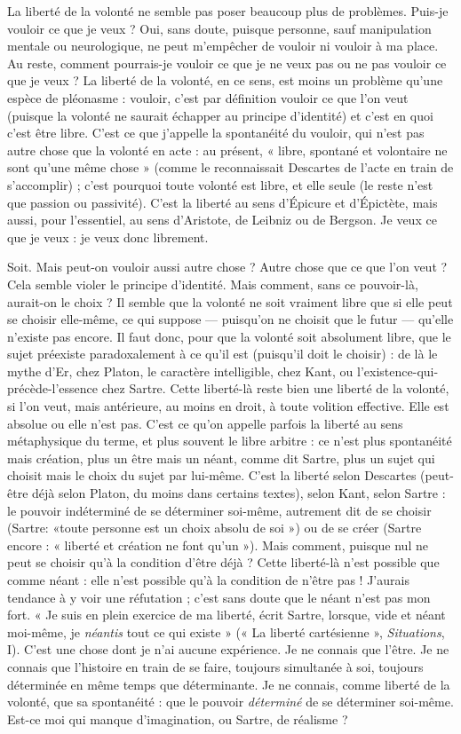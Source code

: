 {La liberté de la volonté ne semble pas poser beaucoup plus de problèmes.
Puis-je vouloir ce que je veux ? Oui, sans doute, puisque personne, sauf manipulation
mentale ou neurologique, ne peut m'empêcher de vouloir ni vouloir à
ma place. Au reste, comment pourrais-je vouloir ce que je ne veux pas ou ne
pas vouloir ce que je veux ? La liberté de la volonté, en ce sens, est moins un
problème qu’une espèce de pléonasme : vouloir, c’est par définition vouloir ce
que l’on veut (puisque la volonté ne saurait échapper au principe d’identité) et
c’est en quoi c’est être libre. C’est ce que j'appelle la spontanéité du vouloir, qui
n’est pas autre chose que la volonté en acte : au présent, « libre, spontané et
volontaire ne sont qu’une même chose » (comme le reconnaissait Descartes de
l'acte en train de s'accomplir) ; c'est pourquoi toute volonté est libre, et elle
seule (le reste n’est que passion ou passivité). C’est la liberté au sens d’Épicure
et d’Épictète, mais aussi, pour l'essentiel, au sens d’Aristote, de Leibniz ou de
Bergson. Je veux ce que je veux : je veux donc librement.

Soit. Mais peut-on vouloir aussi autre chose ? Autre chose que ce que l’on
veut ? Cela semble violer le principe d’identité. Mais comment, sans ce pouvoir-là,
aurait-on le choix ? Il semble que la volonté ne soit vraiment libre que
si elle peut se choisir elle-même, ce qui suppose — puisqu'on ne choisit que le
futur — qu’elle n’existe pas encore. Il faut donc, pour que la volonté soit absolument
libre, que le sujet préexiste paradoxalement à ce qu’il est (puisqu'il doit
le choisir) : de là le mythe d’Er, chez Platon, le caractère intelligible, chez Kant,
ou l’existence-qui-précède-l’essence chez Sartre. Cette liberté-là reste bien une
liberté de la volonté, si l’on veut, mais antérieure, au moins en droit, à toute
volition effective. Elle est absolue ou elle n’est pas. C’est ce qu’on appelle parfois
la liberté au sens métaphysique du terme, et plus souvent le libre arbitre :
ce n’est plus spontanéité mais création, plus un être mais un néant, comme dit
Sartre, plus un sujet qui choisit mais le choix du sujet par lui-même. C’est la
liberté selon Descartes (peut-être déjà selon Platon, du moins dans certains
textes), selon Kant, selon Sartre : le pouvoir indéterminé de se déterminer soi-même,
autrement dit de se choisir (Sartre: «toute personne est un choix
absolu de soi ») ou de se créer (Sartre encore : « liberté et création ne font
qu’un »). Mais comment, puisque nul ne peut se choisir qu’à la condition
d’être déjà ? Cette liberté-là n’est possible que comme néant : elle n’est possible
qu’à la condition de n’être pas ! J'aurais tendance à y voir une réfutation ; c’est
sans doute que le néant n’est pas mon fort. « Je suis en plein exercice de ma
liberté, écrit Sartre, lorsque, vide et néant moi-même, je {\it néantis} tout ce qui
existe » (« La liberté cartésienne », {\it Situations}, I). C’est une chose dont je n’ai
aucune expérience. Je ne connais que l'être. Je ne connais que l’histoire en train
de se faire, toujours simultanée à soi, toujours déterminée en même temps que
déterminante. Je ne connais, comme liberté de la volonté, que sa spontanéité :
que le pouvoir {\it déterminé} de se déterminer soi-même. Est-ce moi qui manque
d'imagination, ou Sartre, de réalisme ?

}
